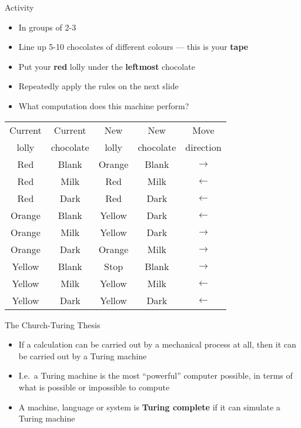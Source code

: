 \begin{frame}{Activity}
    \begin{itemize}
        \pause\item In groups of 2-3
        \pause\item Line up 5-10 chocolates of different colours --- this is your \textbf{tape}
        \pause\item Put your \textbf{red} lolly under the \textbf{leftmost} chocolate
        \pause\item Repeatedly apply the rules on the next slide
        \pause\item What computation does this machine perform?
    \end{itemize}
\end{frame}

\begin{frame}
    \newcommand{\stateA}{Red}
    \newcommand{\stateB}{Orange}
    \newcommand{\stateC}{Yellow}
    \newcommand{\tapeX}{Blank}
    \newcommand{\tapeO}{Milk}
    \newcommand{\tapeI}{Dark}
    \begin{tabular}{|cc|ccc|} \hline
        Current & Current & New & New & Move \\
        lolly & chocolate & lolly & chocolate & direction \\\hline
        \stateA & \tapeX & \stateB & \tapeX & $\rightarrow$ \\
        \stateA & \tapeO & \stateA & \tapeO & $\leftarrow$  \\
        \stateA & \tapeI & \stateA & \tapeI & $\leftarrow$  \\\hline
        \stateB & \tapeX & \stateC & \tapeI & $\leftarrow$  \\
        \stateB & \tapeO & \stateC & \tapeI & $\rightarrow$ \\
        \stateB & \tapeI & \stateB & \tapeO & $\rightarrow$ \\\hline
        \stateC & \tapeX & Stop    & \tapeX & $\rightarrow$ \\
        \stateC & \tapeO & \stateC & \tapeO & $\leftarrow$  \\
        \stateC & \tapeI & \stateC & \tapeI & $\leftarrow$  \\\hline
    \end{tabular}
\end{frame}

\begin{frame}{The Church-Turing Thesis}
    \begin{itemize}
        \pause\item If a calculation can be carried out by a mechanical process at all,
            then it can be carried out by a Turing machine
        \pause\item I.e.\ a Turing machine is the most ``powerful'' computer possible,
            in terms of what is possible or impossible to compute
        \pause\item A machine, language or system is \textbf{Turing complete} if it can simulate a Turing machine
    \end{itemize}
\end{frame}

